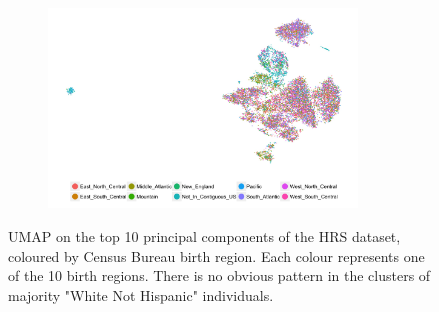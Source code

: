 \documentclass[12pt]{pnas-new}
\begin{document}
\begin{figure}
    \centering
    \begin{subfigure}{\textwidth}
    \includegraphics[width=0.9\textwidth]{images/HRS_1000G_NP1_UMAP_PC10_NC2_NN15_MD05_pca_1kgp_onto_hrs_umap_1kgp_onto_hrs_2018112221116_born.jpeg}
    \end{subfigure}
    \caption{UMAP on the top 10 principal components of the HRS dataset, coloured by Census Bureau birth region. Each colour represents one of the 10 birth regions. There is no obvious pattern in the clusters of majority "White Not Hispanic" individuals.}
    \label{fig:supp_hrs_born}
\end{figure}
\end{document}
